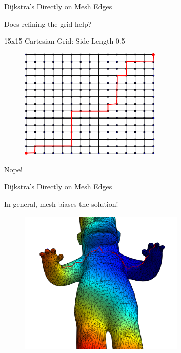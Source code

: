 \documentclass{beamer}
\begin{document}
\begin{frame}{Dijkstra's Directly on Mesh Edges}

Does refining the grid help?

15x15 Cartesian Grid: Side Length 0.5

\begin{figure}[t]
    \includegraphics[width=0.6\textwidth]{15x15CartesianPath.pdf}
\end{figure}

Nope!


\end{frame}


\begin{frame}{Dijkstra's Directly on Mesh Edges}

In general, mesh biases the solution!

\begin{figure}[t]
    \includegraphics[width=0.7\textwidth]{HomerDiscreteRFingerLFinger.pdf}
\end{figure}

\end{frame}
\end{document}
